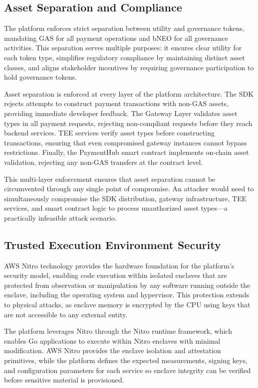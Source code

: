 \documentclass[11pt,a4paper]{article}
\begin{document}
\subsection{Asset Separation and Compliance}

The platform enforces strict separation between utility and governance tokens, mandating GAS for all payment operations and bNEO for all governance activities. This separation serves multiple purposes: it ensures clear utility for each token type, simplifies regulatory compliance by maintaining distinct asset classes, and aligns stakeholder incentives by requiring governance participation to hold governance tokens.

Asset separation is enforced at every layer of the platform architecture. The SDK rejects attempts to construct payment transactions with non-GAS assets, providing immediate developer feedback. The Gateway Layer validates asset types in all payment requests, rejecting non-compliant requests before they reach backend services. TEE services verify asset types before constructing transactions, ensuring that even compromised gateway instances cannot bypass restrictions. Finally, the PaymentHub smart contract implements on-chain asset validation, rejecting any non-GAS transfers at the contract level.

This multi-layer enforcement ensures that asset separation cannot be circumvented through any single point of compromise. An attacker would need to simultaneously compromise the SDK distribution, gateway infrastructure, TEE services, and smart contract logic to process unauthorized asset types---a practically infeasible attack scenario.

\subsection{Trusted Execution Environment Security}

AWS Nitro technology provides the hardware foundation for the platform's security model, enabling code execution within isolated enclaves that are protected from observation or manipulation by any software running outside the enclave, including the operating system and hypervisor. This protection extends to physical attacks, as enclave memory is encrypted by the CPU using keys that are not accessible to any external entity.

The platform leverages Nitro through the Nitro runtime framework, which enables Go applications to execute within Nitro enclaves with minimal modification. AWS Nitro provides the enclave isolation and attestation primitives, while the platform defines the expected measurements, signing keys, and configuration parameters for each service so enclave integrity can be verified before sensitive material is provisioned.
\end{document}
